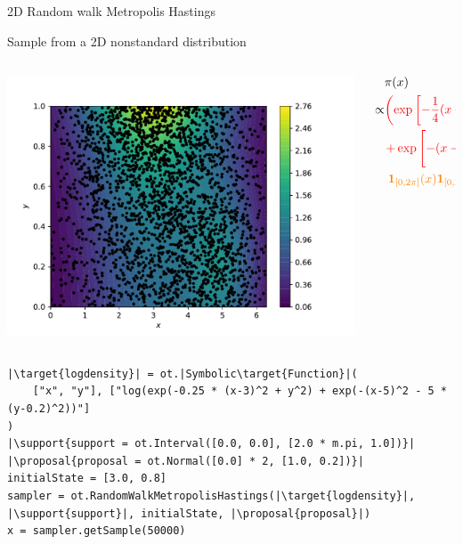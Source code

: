 \documentclass{beamer}
\newcommand{\target}[1]{\textcolor{red}{#1}}
\newcommand{\proposal}[1]{\textcolor{blue}{#1}}
\newcommand{\support}[1]{\textcolor{orange}{#1}}
\begin{document}
\begin{frame}[containsverbatim]{2D Random walk Metropolis Hastings}
    \begin{block}{Sample from a 2D nonstandard distribution}
        \begin{columns}
            \begin{column}{0.4\textwidth}
                \includegraphics[width=\textwidth]{figures/2d}
            \end{column}
            \begin{column}{0.6\textwidth}
                \vspace{-0.5cm}
                \begin{align*}
                    & \pi(x) \\ \propto & \target{\left( \exp\left[-\frac{1}{4} (x-3)^2 + y^2\right] \right.}\\
                    & \target{ \left. + \exp\left[-(x-5)^2 - 5 \left(y-\frac{1}{5} \right)^2 \right] \right) }\\
                    & \; \support{\mathbf{1}_{[0, 2 \pi]}(x)} \support{\mathbf{1}_{[0, 1]}(y)}
                \end{align*}
            \end{column}
        \end{columns}



\begin{lstlisting}
|\target{logdensity}| = ot.|Symbolic\target{Function}|(
    ["x", "y"], ["log(exp(-0.25 * (x-3)^2 + y^2) + exp(-(x-5)^2 - 5 * (y-0.2)^2))"]
)
|\support{support = ot.Interval([0.0, 0.0], [2.0 * m.pi, 1.0])}|
|\proposal{proposal = ot.Normal([0.0] * 2, [1.0, 0.2])}|
initialState = [3.0, 0.8]
sampler = ot.RandomWalkMetropolisHastings(|\target{logdensity}|, |\support{support}|, initialState, |\proposal{proposal}|)
x = sampler.getSample(50000)
\end{lstlisting}
    \end{block}
\end{frame}
\end{document}

